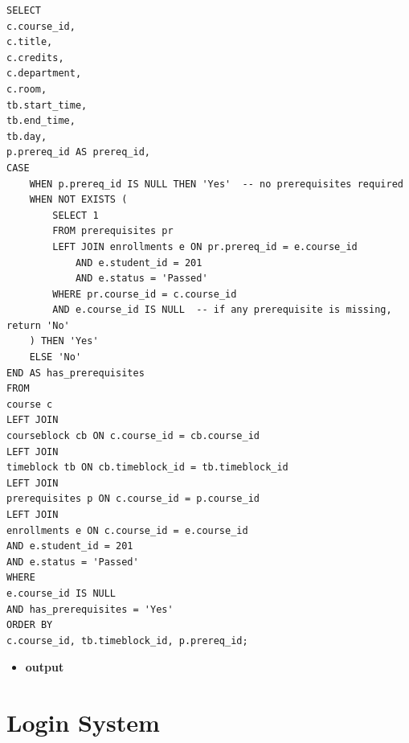 \documentclass{report}
\makeatletter
\newenvironment{fullcenter}%
    {\@parboxrestore%
    \begin{adjustwidth}{}{\leftmargin}%
    \begin{center}%
    }{\end{center}%
    \end{adjustwidth}%
    }
\newcommand{\usection}[1]{\section*{#1}
\addcontentsline{toc}{section}{\protect\numberline{}#1}}
\makeatother
\begin{document}
\begin{lstlisting}
SELECT
c.course_id,
c.title,
c.credits,
c.department,
c.room,
tb.start_time,
tb.end_time,
tb.day,
p.prereq_id AS prereq_id,
CASE
    WHEN p.prereq_id IS NULL THEN 'Yes'  -- no prerequisites required
    WHEN NOT EXISTS (
        SELECT 1
        FROM prerequisites pr
        LEFT JOIN enrollments e ON pr.prereq_id = e.course_id
            AND e.student_id = 201
            AND e.status = 'Passed'
        WHERE pr.course_id = c.course_id
        AND e.course_id IS NULL  -- if any prerequisite is missing, return 'No'
    ) THEN 'Yes'
    ELSE 'No'
END AS has_prerequisites
FROM 
course c
LEFT JOIN 
courseblock cb ON c.course_id = cb.course_id
LEFT JOIN 
timeblock tb ON cb.timeblock_id = tb.timeblock_id
LEFT JOIN 
prerequisites p ON c.course_id = p.course_id
LEFT JOIN 
enrollments e ON c.course_id = e.course_id
AND e.student_id = 201
AND e.status = 'Passed'
WHERE 
e.course_id IS NULL
AND has_prerequisites = 'Yes'
ORDER BY 
c.course_id, tb.timeblock_id, p.prereq_id;
\end{lstlisting}

\begin{itemize}
    \item \textbf{output}
    \begin{fullcenter}
    \end{fullcenter}
\end{itemize}

\pagebreak

\usection{Login System}
\end{document}
